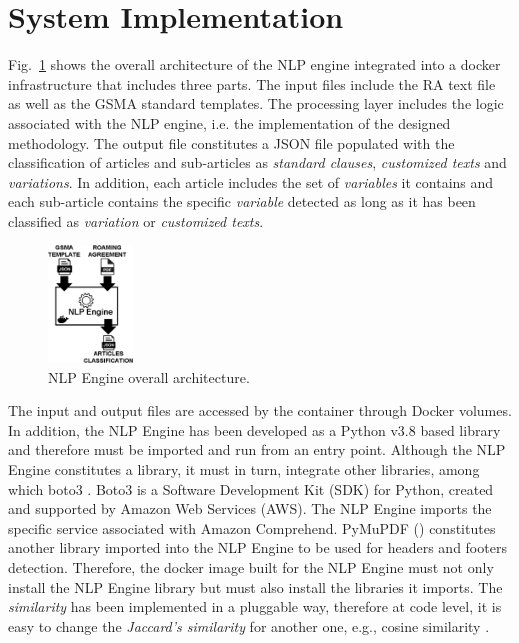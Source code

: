 \section{System Implementation}\label{implementation}
Fig.~\ref{fig2} shows the overall architecture of the NLP engine integrated into a docker infrastructure that includes three parts. The input files include the RA text file as well as the GSMA standard templates. The processing layer includes the logic associated with the NLP engine, i.e. the implementation of the designed methodology. The output file constitutes a JSON file populated with the classification of articles and sub-articles as \textit{standard clauses}, \textit{customized texts} and \textit{variations}. In addition, each article includes the set of \textit{variables} it contains and each sub-article contains the specific \textit{variable} detected as long as it has been classified as \textit{variation} or \textit{customized texts}.

\begin{figure}[htbp]
\centerline{\includegraphics[width=0.20\textwidth]{images/NLP_Engine.png}}
\caption{NLP Engine overall architecture.}
\label{fig2}
\end{figure}

The input and output files are accessed by the container through Docker volumes. In addition, the NLP Engine has been developed as a Python v3.8 based library and therefore must be imported and run from an entry point. Although the NLP Engine constitutes a library, it must in turn, integrate other libraries, among which boto3 \cite{boto3}. Boto3 is a Software Development Kit (SDK) for Python, created and supported by Amazon Web Services (AWS). The NLP Engine imports the specific service associated with Amazon Comprehend. PyMuPDF (\cite{PyMuPDF}) constitutes another library imported into the NLP Engine to be used for headers and footers detection. Therefore, the docker image built for the NLP Engine must not only install the NLP Engine library but must also install the libraries it imports. The \textit{similarity} has been implemented in a pluggable way, therefore at code level, it is easy to change the \textit{Jaccard's similarity} for another one, e.g., cosine similarity \cite{Gupta2018}.

